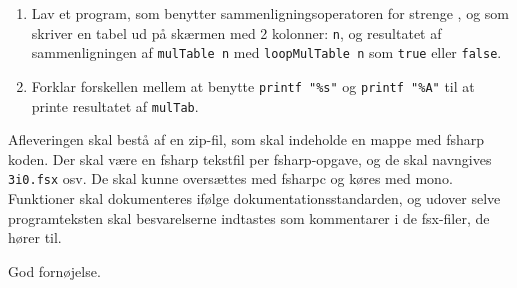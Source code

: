\documentclass[a4paper,12pt]{article}
\begin{document}
\begin{enumerate}[label=3i.\arabic*,start=0]
\begin{enumerate}
  \item Lav et program, som benytter sammenligningsoperatoren for strenge \lexeme{=}, og som skriver en tabel ud på skærmen med 2 kolonner: \lstinline!n!, og resultatet af sammenligningen af \mbox{\lstinline!mulTable n!} med \mbox{\lstinline!loopMulTable n!} som \lstinline!true! eller \lstinline!false!.
  \item Forklar forskellen mellem at benytte \lstinline!printf "%s"! og \lstinline!printf "%A"! til at printe resultatet af \lstinline!mulTab!.
  \end{enumerate}
\end{enumerate}
Afleveringen skal bestå af en zip-fil, som skal indeholde en mappe med fsharp koden. Der skal være en fsharp tekstfil per fsharp-opgave, og de skal navngives \verb|3i0.fsx| osv. De skal kunne oversættes med fsharpc og køres med mono. Funktioner skal dokumenteres ifølge dokumentationsstandarden, og udover selve programteksten skal besvarelserne indtastes som kommentarer i de fsx-filer, de hører til.

\flushright God fornøjelse.
\end{document}
